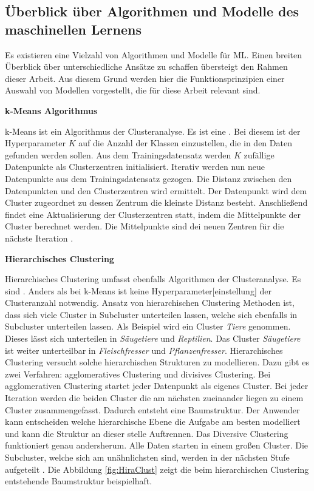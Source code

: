 \subsection{Überblick über Algorithmen und Modelle des maschinellen Lernens} \label{sec:ML Algorithmen}
Es existieren eine Vielzahl von Algorithmen und Modelle für \gls{ML}. Einen breiten Überblick über unterschiedliche Ansätze zu schaffen übersteigt den Rahmen dieser Arbeit. Aus diesem Grund werden hier die Funktionsprinzipien einer Auswahl von Modellen vorgestellt, die für diese Arbeit relevant sind. 

\textbf{k-Means Algorithmus} \par
k-Means ist ein Algorithmus der Clusteranalyse. Es ist eine . Bei diesem ist der \gls{Hyperparameter} \(K\) auf die Anzahl der Klassen einzustellen, die in den Daten gefunden werden sollen. Aus dem \gls{Trainingsdatensatz} werden \(K\) zufällige Datenpunkte als Clusterzentren initialisiert. Iterativ werden nun neue Datenpunkte aus dem \gls{Trainingsdatensatz} gezogen. Die Distanz zwischen den Datenpunkten und den Clusterzentren wird ermittelt. Der Datenpunkt wird dem Cluster zugeordnet zu dessen Zentrum die kleinste Distanz besteht. Anschließend findet eine Aktualisierung der Clusterzentren statt, indem die Mittelpunkte der Cluster berechnet werden. Die Mittelpunkte sind dei neuen Zentren für die nächste Iteration \cite{Burkov.2019, Goodfellow.2016, Duda.2001}. \dubpar


\textbf{Hierarchisches Clustering} \par
Hierarchisches Clustering umfasst ebenfalls Algorithmen der Clusteranalyse. Es sind . Anders als bei k-Means ist keine \gls{Hyperparameter}[einstellung] der Clusteranzahl notwendig. Ansatz von hierarchischen Clustering Methoden ist, dass sich viele Cluster in Subcluster unterteilen lassen, welche sich ebenfalls in Subcluster unterteilen lassen. Als Beispiel wird ein Cluster \textit{Tiere} genommen. Dieses lässt sich unterteilen in \textit{Säugetiere} und \textit{Reptilien}. Das Cluster \textit{Säugetiere} ist weiter unterteilbar in \textit{Fleischfresser} und \textit{Pflanzenfresser}. Hierarchisches Clustering versucht solche hierarchischen Strukturen zu modellieren. Dazu gibt es zwei Verfahren: agglomeratives Clustering und divisives Clustering. Bei agglomerativen Clustering startet jeder Datenpunkt als eigenes Cluster. Bei jeder Iteration werden die beiden Cluster die am nächsten zueinander liegen zu einem Cluster zusammengefasst. Dadurch entsteht eine Baumstruktur. Der Anwender kann entscheiden welche hierarchische Ebene die Aufgabe am besten modelliert und kann die Struktur an dieser stelle Auftrennen. Das Diversive Clustering funktioniert genau andersherum. Alle Daten starten in einem großen Cluster. Die Subcluster, welche sich am unähnlichsten sind, werden in der nächsten Stufe aufgeteilt \cite{Duda.2001}. Die Abbildung \ref{fig:HiraClust} zeigt die beim hierarchischen Clustering entstehende Baumstruktur beispielhaft. 

